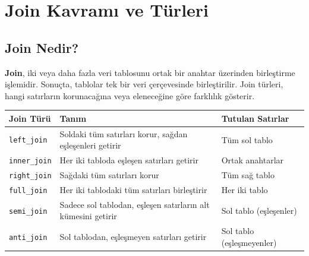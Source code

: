 \documentclass[
  letterpaper,
  DIV=11,
  numbers=noendperiod]{scrreprt}
\begin{document}
\section*{Join Kavramı ve Türleri}\label{join-kavramux131-ve-tuxfcrleri}


\subsection*{Join Nedir?}\label{join-nedir}

\textbf{Join}, iki veya daha fazla veri tablosunu ortak bir anahtar
üzerinden birleştirme işlemidir. Sonuçta, tablolar tek bir veri
çerçevesinde birleştirilir. Join türleri, hangi satırların korunacağına
veya eleneceğine göre farklılık gösterir.

\begin{longtable}[]{@{}
  >{\raggedright\arraybackslash}p{}
  >{\raggedright\arraybackslash}p{}
  >{\raggedright\arraybackslash}p{}@{}}
\toprule\noalign{}
\begin{minipage}[b]{\linewidth}\raggedright
Join Türü
\end{minipage} & \begin{minipage}[b]{\linewidth}\raggedright
Tanım
\end{minipage} & \begin{minipage}[b]{\linewidth}\raggedright
Tutulan Satırlar
\end{minipage} \\
\midrule\noalign{}
\endhead
\bottomrule\noalign{}
\endlastfoot
\texttt{left\_join} & Soldaki tüm satırları korur, sağdan eşleşenleri
getirir & Tüm sol tablo \\
\texttt{inner\_join} & Her iki tabloda eşleşen satırları getirir & Ortak
anahtarlar \\
\texttt{right\_join} & Sağdaki tüm satırları korur & Tüm sağ tablo \\
\texttt{full\_join} & Her iki tablodaki tüm satırları birleştirir & Her
iki tablo \\
\texttt{semi\_join} & Sadece sol tablodan, eşleşen satırların alt
kümesini getirir & Sol tablo (eşleşenler) \\
\texttt{anti\_join} & Sol tablodan, eşleşmeyen satırları getirir & Sol
tablo (eşleşmeyenler) \\
\end{longtable}
\end{document}
